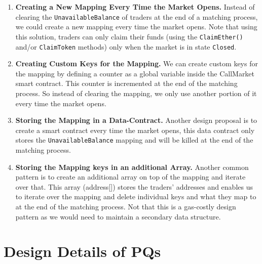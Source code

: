 \begin{enumerate}

\item \textbf{Creating a New Mapping Every Time the Market Opens.} Instead of clearing the \texttt{UnavailableBalance} of traders at the end of a matching process, we could create a new mapping every time the market opens. Note that using this solution, traders can only claim their funds (using the \texttt{ClaimEther()} and/or \texttt{ClaimToken} methods) only when the market is in state \texttt{Closed}. 


\item \textbf{Creating Custom Keys for the Mapping.} We can create custom keys for the mapping by defining a counter as a global variable inside the CallMarket smart contract. This counter is incremented at the end of the matching process. So instead of clearing the mapping, we only use another portion of it every time the market opens.


\item \textbf{Storing the Mapping in a Data-Contract.} Another design proposal is to create a smart contract every time the market opens, this data contract only stores the \texttt{UnavailableBalance} mapping and will be killed at the end of the matching process.



\item \textbf{Storing the Mapping keys in an additional Array.} Another common pattern is to create an additional array on top of the mapping and iterate over that. This array (\eg address[]) stores the traders' addresses and enables us to iterate over the mapping and delete individual keys and what they map to at the end of the matching process. Not that this is a gas-costly design pattern as we would need to maintain a secondary data structure.



\end{enumerate}


\section{Design Details of PQs}


